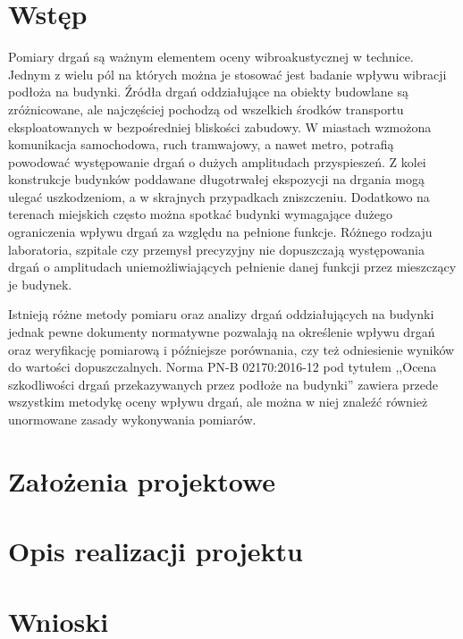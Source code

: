 \documentclass[a4paper,12pt]{mwart}
\begin{document}
    \section{Wstęp}

    Pomiary drgań są ważnym elementem oceny wibroakustycznej w technice. Jednym
    z wielu pól na których można je stosować jest badanie wpływu wibracji
    podłoża na budynki. Źródła drgań oddziałujące na obiekty budowlane są
    zróżnicowane, ale najczęściej pochodzą od wszelkich środków transportu
    eksploatowanych w bezpośredniej bliskości zabudowy. W miastach wzmożona
    komunikacja samochodowa, ruch tramwajowy, a nawet metro, potrafią powodować
    występowanie drgań o dużych amplitudach przyspieszeń. Z kolei konstrukcje
    budynków poddawane długotrwałej ekspozycji na drgania mogą ulegać
    uszkodzeniom, a w skrajnych przypadkach zniszczeniu. Dodatkowo na terenach
    miejskich często można spotkać budynki wymagające dużego ograniczenia wpływu
    drgań za względu na pełnione funkcje. Różnego rodzaju laboratoria, szpitale
    czy przemysł precyzyjny nie dopuszczają występowania drgań o amplitudach
    uniemożliwiających pełnienie danej funkcji przez mieszczący je budynek.
    
    Istnieją różne metody pomiaru oraz analizy drgań oddziałujących na budynki
    jednak pewne dokumenty normatywne pozwalają na określenie wpływu drgań oraz
    weryfikację pomiarową i późniejsze porównania, czy też odniesienie wyników
    do wartości dopuszczalnych. Norma PN-B 02170:2016-12 pod tytułem ,,Ocena
    szkodliwości drgań przekazywanych przez podłoże na budynki'' \cite{norma}
    zawiera przede wszystkim metodykę oceny wpływu drgań, ale można w niej
    znaleźć również unormowane zasady wykonywania pomiarów.

    \section{Założenia projektowe}

    \section{Opis realizacji projektu}

    \section{Wnioski}

    \printbibliography
\end{document}
